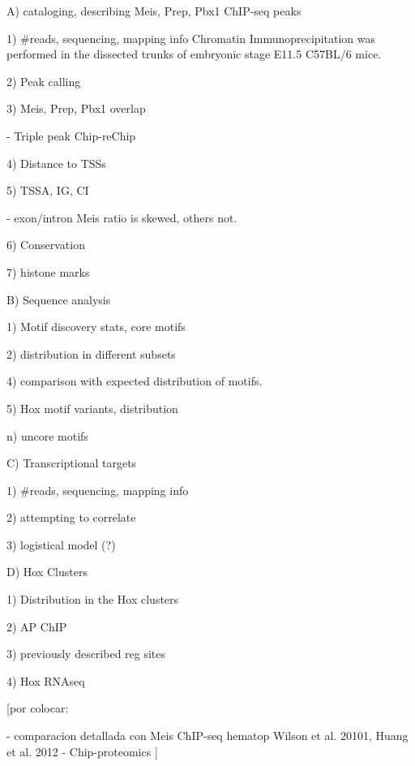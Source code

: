 A) cataloging, describing Meis, Prep, Pbx1 ChIP-seq peaks

	1) #reads, sequencing, mapping info
		Chromatin Immunoprecipitation was performed in the dissected trunks of embryonic stage E11.5 C57BL/6 mice.

	2) Peak calling

	3) Meis, Prep, Pbx1 overlap

		- Triple peak Chip-reChip

	4) Distance to TSSs

	5) TSSA, IG, CI

		- exon/intron Meis ratio is skewed, others not.

	6) Conservation

	7) histone marks


B) Sequence analysis

	1) Motif discovery stats, core motifs

	2) distribution in different subsets

	4) comparison with expected distribution of motifs.

	5) Hox motif variants, distribution 

	n) uncore motifs

C) Transcriptional targets

	1) #reads, sequencing, mapping info

	2) attempting to correlate

	3) logistical model (?)

D) Hox Clusters

	1) Distribution in the Hox clusters

	2) AP ChIP

	3) previously described reg sites

	4) Hox RNAseq


[por colocar:

- comparacion detallada con Meis ChIP-seq hematop {Wilson et al. 20101, Huang et al. 2012}
- Chip-proteomics
]
